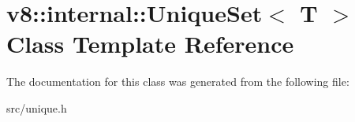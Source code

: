 \hypertarget{classv8_1_1internal_1_1_unique_set}{}\section{v8\+:\+:internal\+:\+:Unique\+Set$<$ T $>$ Class Template Reference}
\label{classv8_1_1internal_1_1_unique_set}


The documentation for this class was generated from the following file\+:\begin{DoxyCompactItemize}
\item 
src/unique.\+h\end{DoxyCompactItemize}
